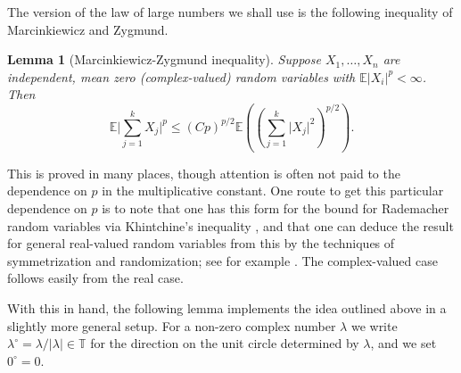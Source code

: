 \documentclass[12pt,a4paper,reqno]{amsart}
\numberwithin{equation}{section}
\theoremstyle{plain}
\newtheorem{lemma}[subsection]{Lemma}
\theoremstyle{definition}
\renewcommand{\leq}{\leqslant}
\def\E{\mathbb{E}}
\def\T{\mathbb{T}}
\providecommand{\abs}[1]{\lvert#1\rvert}
\theoremstyle{plain}
\begin{document}
The version of the law of large numbers we shall use is the following inequality of Marcinkiewicz and Zygmund.

\begin{lemma}[Marcinkiewicz-Zygmund inequality]
Suppose $X_1, \ldots, X_n$ are independent, mean zero (complex-valued) random variables with $\E \abs{X_i}^p < \infty$. Then
\[ \E \abs{ \sum_{j=1}^k X_j }^p \leq (Cp)^{p/2} \E \left( \left( \sum_{j=1}^k \abs{X_j}^2 \right)^{p/2} \right).\]
\end{lemma}
This is proved in many places, though attention is often not paid to the dependence on $p$ in the multiplicative constant. One route to get this particular dependence on $p$ is to note that one has this form for the bound for Rademacher random variables via Khintchine's inequality \cite{khintchine}, and that one can deduce the result for general real-valued random variables from this by the techniques of symmetrization and randomization; see for example \cite[\S 3.8]{gut}. The complex-valued case follows easily from the real case.

With this in hand, the following lemma implements the idea outlined above in a slightly more general setup. For a non-zero complex number $\lambda$ we write $\lambda^{\circ} = \lambda/\abs{\lambda} \in \T$ for the direction on the unit circle determined by $\lambda$, and we set $0^{\circ} = 0$.
\end{document}
